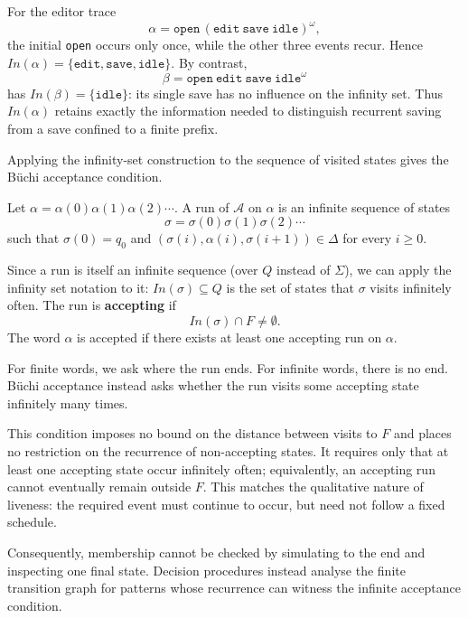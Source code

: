 \begin{example}
\label{ex:infinitely-many-save}
For the editor trace
\[
  \alpha=\texttt{open}\,
          (\texttt{edit}\ \texttt{save}\ \texttt{idle})^\omega,
\]
the initial \texttt{open} occurs only once, while the other three events
recur.  Hence
$In(\alpha)=\{\texttt{edit},\texttt{save},\texttt{idle}\}$.
By contrast,
\[
  \beta=\texttt{open}\ \texttt{edit}\ \texttt{save}\ \texttt{idle}^\omega
\]
has $In(\beta)=\{\texttt{idle}\}$: its single save has no influence on the
infinity set.  Thus $In(\alpha)$ retains exactly the information needed to
distinguish recurrent saving from a save confined to a finite prefix.
\end{example}

Applying the infinity-set construction to the sequence of visited states
gives the B\"uchi acceptance condition.

\begin{definition}
\label{def:buchi-run}
Let $\alpha=\alpha(0)\alpha(1)\alpha(2)\cdots$.  A run of $\mathcal{A}$ on
$\alpha$ is an infinite sequence of states
\[
  \sigma=\sigma(0)\sigma(1)\sigma(2)\cdots
\]
such that $\sigma(0)=q_0$ and
$(\sigma(i),\alpha(i),\sigma(i+1))\in\Delta$ for every $i\geq 0$.

Since a run is itself an infinite sequence (over $Q$ instead of $\Sigma$),
we can apply the infinity set notation to it:
$In(\sigma)\subseteq Q$ is the set of states that $\sigma$ visits infinitely
often.  The run is \textbf{accepting} if
\[
  In(\sigma)\cap F\neq\emptyset.
\]
The word $\alpha$ is accepted if there exists at least one accepting run
on $\alpha$.
\end{definition}

For finite words, we ask where the run ends.  For infinite words, there
is no end.  B\"uchi acceptance instead asks whether the run visits some
accepting state infinitely many times.

This condition imposes no bound on the distance between visits to $F$ and
places no restriction on the recurrence of non-accepting states.  It
requires only that at least one accepting state occur infinitely often;
equivalently, an accepting run cannot eventually remain outside $F$.
This matches the qualitative nature of liveness: the required event must
continue to occur, but need not follow a fixed schedule.

Consequently, membership cannot be checked by simulating to the end and
inspecting one final state.  Decision procedures instead analyse the
finite transition graph for patterns whose recurrence can witness the
infinite acceptance condition.

